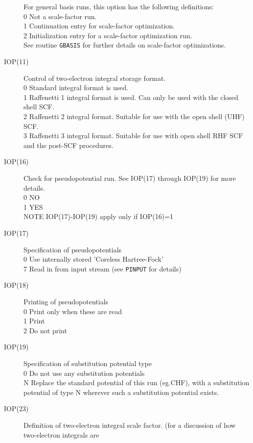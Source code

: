 \begin{description}
For general basis runs, this option has the following
definitions:  \\
0  Not a scale-factor run. \\
1  Continuation entry for scale-factor optimization. \\
2  Initialization entry for a scale-factor optimization run. \\
See routine {\tt GBASIS} for further details on scale-factor
optimizations.
\item[IOP(11)]  Control of two-electron integral storage format.  \\
0  Standard integral format is used. \\
1  Raffenetti 1 integral format is used. Can only be used with the 
closed shell SCF.  \\
2  Raffenetti 2 integral format. Suitable for use with the open 
shell (UHF) SCF.  \\
3  Raffenetti 3 integral format. Suitable for use with open shell 
RHF SCF and the post-SCF procedures.  \\
\item[IOP(16)]  Check for pseudopotential run. See IOP(17) through
IOP(19) for more details. \\
0  NO \\
1  YES \\
NOTE IOP(17)-IOP(19) apply only if IOP(16)=1
\item[IOP(17)]  Specification of pseudopotentials  \\
0  Use internally stored 'Coreless Hartree-Fock' \\
7  Read in from input stream (see {\tt PINPUT} for details) \\
\item[IOP(18)]  Printing of pseudopotentials  \\
0  Print only when these are read \\
1  Print \\
2  Do not print \\
\item[IOP(19)]  Specification of substitution potential type  \\
0  Do not use any substitution potentials \\
N Replace the standard potential of this run (eg.CHF),
with a substitution potential of type N wherever such
a substitution potential exists.  \\
\item[IOP(23)]  Definition of two-electron integral scale factor.
(for a discussion of how two-electron integrals are

\end{description}
